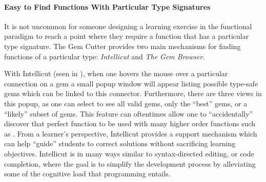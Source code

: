 \paragraph{Easy to Find Functions With Particular Type Signatures}

It is not uncommon for someone designing a learning exercise in the functional paradigm to reach a point where they require a function that has a particular type signature.  The Gem Cutter provides two main mechanisms for finding functions of a particular type: \emph{Intellicut} and \emph{The Gem Browser}.  

With Intellicut (seen in ), when one hovers the mouse over a particular connection on a gem a small popup window will appear listing possible type-safe gems which can be linked to this connector.  Furthermore, there are three views in this popup, as one can select to see all valid gems, only the ``best'' gems, or a ``likely'' subset of gems.  This feature can oftentimes allow one to ``accidentally'' discover that perfect function to be used with many higher order functions such as .  From a learner's perspective, Intellicut provides a support mechanism which can help ``guide'' students to correct solutions without sacrificing learning objectives.  Intellicut is in many ways similar to syntax-directed editing, or code completion, where the goal is to simplify the development process by alleviating some of the cognitive load that programming entails.


